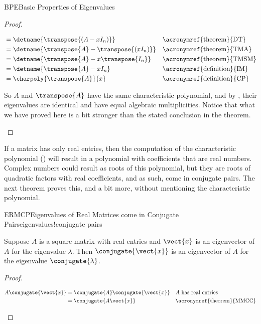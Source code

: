 \begin{subsect}{BPE}{Basic Properties of Eigenvalues}
\begin{proof}
\begin{para}
\begin{align*}
&=\detname{\transpose{\left(A-xI_n\right)}}&&\text{\acronymref{theorem}{DT}}\\
&=\detname{\transpose{A}-\transpose{\left(xI_n\right)}}&&\text{\acronymref{theorem}{TMA}}\\
&=\detname{\transpose{A}-x\transpose{I_n}}&&\text{\acronymref{theorem}{TMSM}}\\
&=\detname{\transpose{A}-xI_n}&&\text{\acronymref{definition}{IM}}\\
&=\charpoly{\transpose{A}}{x}&&\text{\acronymref{definition}{CP}}\\
%
\end{align*}
\end{para}
%
\begin{para}So $A$ and $\transpose{A}$ have the same characteristic polynomial, and by , their eigenvalues are identical and have equal algebraic multiplicities.  Notice that what we have proved here is a bit stronger than the stated conclusion in the theorem.\end{para}
%
\end{proof}
%
\begin{para}If a matrix has only real entries, then the computation of the characteristic polynomial () will result in a polynomial with coefficients that are real numbers.  Complex numbers could result as roots of this polynomial, but they are roots of quadratic factors with real coefficients, and as such, come in conjugate pairs.  The next theorem proves this, and a bit more, without mentioning the characteristic polynomial.\end{para}
%
\begin{theorem}{ERMCP}{Eigenvalues of Real Matrices come in Conjugate Pairs}{eigenvalues!conjugate pairs}
\begin{para}Suppose $A$ is a square matrix with real entries and $\vect{x}$ is an eigenvector of $A$ for the eigenvalue $\lambda$.  Then $\conjugate{\vect{x}}$ is an eigenvector of $A$ for the eigenvalue $\conjugate{\lambda}$.\end{para}
\end{theorem}
%
\begin{proof}
%
\begin{para}
\begin{align*}
A\conjugate{\vect{x}}&=\conjugate{A}\conjugate{\vect{x}}&&\text{$A$ has real entries}\\
&=\conjugate{A\vect{x}}&&\text{\acronymref{theorem}{MMCC}}\\

\end{align*}
\end{para}
\end{proof}
\end{subsect}
